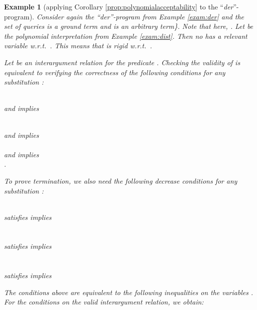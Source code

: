 \documentclass[envcountsame]{tlp}
\newcounter{ex:der-lastsymconsctr}
\newtheorem{example}{Example}
\begin{document}
\begin{example}[applying Corollary \ref{prop:polynomialacceptability} to the
``\textit{der}''-program]\label{rigid-order:der}
Consider again the ``\textit{der}''-program from Example \ref{exam:der}
and the  set of queries  is a ground
term and
 is an arbitrary term\}. Note that here, .
Let  be the polynomial interpretation from Example \ref{exam:dist}. 
Then no  has a relevant variable w.r.t.\
.
This
means that  is rigid w.r.t.\ .


Let  be an
interargument relation for the predicate .
Checking the validity of  is equivalent to
verifying the correctness of the following conditions for any substitution
:
\begin{center}
    \\\vspace{3mm} 
     and 
 implies \\  
    \\\vspace{3mm} 

     and 
 implies \\ 
\\\vspace{3mm}
     and 
 implies\\
    .\\\vspace{3mm}
\end{center}

To prove termination, we also need the following decrease conditions for any substitution
:
\begin{center}
    \\\vspace{2mm}
     satisfies  implies \\
\\\vspace{2mm}
    \\\vspace{2mm}
     satisfies  implies \\
\\\vspace{2mm}
    \\\vspace{2mm}
     satisfies  implies \\

\end{center}

The conditions above 
are equivalent to the following inequalities on the
variables . For the conditions on the valid interargument
relation, we obtain:


\end{example}
\end{document}
